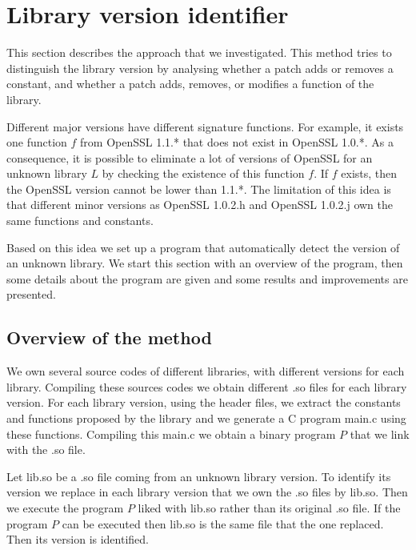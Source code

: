\documentclass{article}
\begin{document}
\section{Library version identifier}
\label{section:libraryChecker}

    This section describes the approach that we investigated. This method
    tries to distinguish the library version by analysing whether a patch adds
    or removes a constant, and whether a patch adds, removes, or modifies a
    function of the library.
	   
    Different major versions have different signature functions. For example,
    it exists one function $f$ from OpenSSL 1.1.* that does not exist in
    OpenSSL 1.0.*. As a consequence, it is possible to eliminate a lot of
    versions of OpenSSL for an unknown library $L$ by checking the existence
    of this function $f$. If $f$ exists, then the OpenSSL version cannot be
    lower than 1.1.*. The limitation of this idea is that different minor
    versions as OpenSSL 1.0.2.h and OpenSSL 1.0.2.j own the same functions and
    constants.
   
    Based on this idea we set up a program that automatically detect the version of an
    unknown library. We start this section with an overview of the program, then
    some details about the program are given and some results and improvements are
    presented.

	\subsection{Overview of the method}
   
    We own several source codes of different libraries, with different
    versions for each library. Compiling these sources codes we obtain
    different .so files for each library version.  For each library version,
    using the header files, we extract the constants and functions proposed by
    the library and we generate a C program main.c using these functions.
    Compiling this main.c we obtain a binary program $P$ that we link with the
    .so file.


    Let lib.so be a .so file coming from an unknown library version. To
    identify its version we replace in each library version that we own the
    .so files by lib.so. Then we execute the program $P$ liked with lib.so
    rather than its original .so file.  If the program $P$ can be executed
    then lib.so is the same file that the one replaced. Then its version is
    identified.
 
\end{document}
